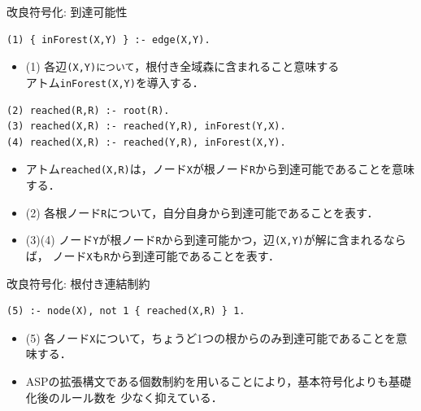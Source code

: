 \documentclass[dvipdfmx,11pt]{beamer}
\newcommand{\code}[1]{\lstinline[basicstyle=\ttfamily]{#1}}
\begin{document}
\begin{frame}[fragile]{改良符号化: 到達可能性}
\begin{exampleblock}{}\small
\begin{lstlisting}
(1) { inForest(X,Y) } :- edge(X,Y).
\end{lstlisting}
\end{exampleblock}
\begin{itemize}
 \item (1) 各辺\code{(X,Y)について}，根付き全域森に含まれること意味する \\
	  アトム\code{inForest(X,Y)}を導入する．
\end{itemize}
\begin{exampleblock}{}\small
\begin{lstlisting}
(2) reached(R,R) :- root(R).
(3) reached(X,R) :- reached(Y,R), inForest(Y,X).
(4) reached(X,R) :- reached(Y,R), inForest(X,Y).
\end{lstlisting}
\end{exampleblock}
\vfill
\begin{itemize}
\item アトム\code{reached(X,R)}は，ノード\code{X}が根ノード\code{R}から到達可能であることを意味する．
\item (2) 各根ノード\code{R}について，自分自身から到達可能であることを表す．
\item (3)(4) ノード\code{Y}が根ノード\code{R}から到達可能かつ，辺\code{(X,Y)}が解に含まれるならば，
	  ノード\code{X}も\code{R}から到達可能であることを表す．
\end{itemize}
\end{frame}
\begin{frame}[fragile]{改良符号化: 根付き連結制約}
\begin{exampleblock}{}\small
\begin{lstlisting}
(5) :- node(X), not 1 { reached(X,R) } 1.
\end{lstlisting}
\end{exampleblock}
\vfill
\begin{itemize}
\item (5) 各ノード\code{X}について，ちょうど1つの根からのみ到達可能であることを意味する．
\item ASPの拡張構文である個数制約を用いることにより，基本符号化よりも基礎化後のルール数を
	  少なく抑えている．
\end{itemize}
\end{frame}
\end{document}
